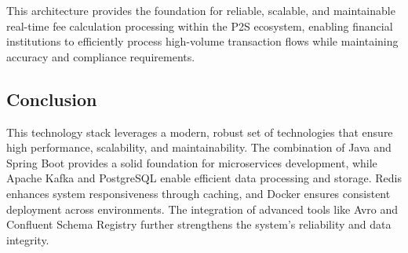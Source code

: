 This architecture provides the foundation for reliable, scalable, and maintainable real-time fee calculation processing within the P2S ecosystem, enabling financial institutions to efficiently process high-volume transaction flows while maintaining accuracy and compliance requirements.







\subsection{Conclusion}
This technology stack leverages a modern, robust set of technologies that ensure high performance, scalability, and maintainability. The combination of Java and Spring Boot provides a solid foundation for microservices development, while Apache Kafka and PostgreSQL enable efficient data processing and storage. Redis enhances system responsiveness through caching, and Docker ensures consistent deployment across environments. The integration of advanced tools like Avro and Confluent Schema Registry further strengthens the system's reliability and data integrity.

